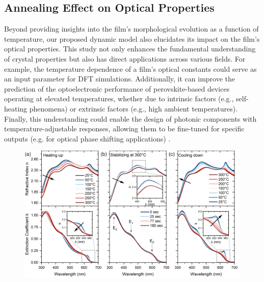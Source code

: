 \subsection{Annealing Effect on Optical Properties}

Beyond providing insights into the film's morphological evolution as a function of temperature, our proposed dynamic model also elucidates its impact on the film’s optical properties. This study not only enhances the fundamental understanding of crystal properties but also has direct applications across various fields. For example, the temperature dependence of a film's optical constants could serve as an input parameter for DFT simulations. Additionally, it can improve the prediction of the optoelectronic performance of perovskite-based devices operating at elevated temperatures, whether due to intrinsic factors (e.g., self-heating phenomena) or extrinsic factors (e.g., high ambient temperatures). Finally, this understanding could enable the design of photonic components with temperature-adjustable responses, allowing them to be fine-tuned for specific outputs (e.g. for optical phase shifting applications) \cite{Handa2019LargePerovskite}.

\begin{figure}
  \centering
  \medskip
  \includegraphics[width=.99\textwidth]{chapters/ellipsometry/image/Optical Constants_labeled.png}
  \caption{}
  \label{fig:ellipsometry:optical_constants}
\end{figure}


